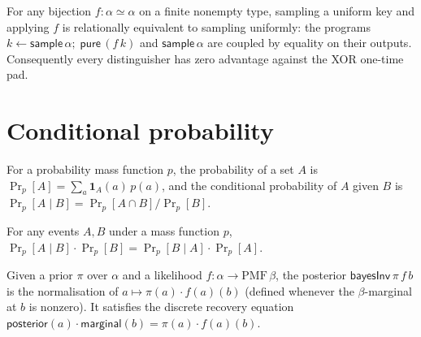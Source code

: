 \begin{lemma}
  \label{lem:rhoare-sample-bij}
  \leanok
  For any bijection $f : \alpha \simeq \alpha$ on a finite nonempty type,
  sampling a uniform key and applying $f$ is relationally equivalent to sampling
  uniformly: the programs $k \leftarrow \mathsf{sample}\,\alpha;\;
  \mathsf{pure}\,(f\,k)$ and $\mathsf{sample}\,\alpha$ are coupled by equality on
  their outputs. Consequently every distinguisher has zero advantage against the
  XOR one-time pad.
\end{lemma}

\section{Conditional probability}

\begin{definition}
  \label{def:pmf-condprob}
  \leanok
  For a probability mass function $p$, the probability of a set $A$ is
  $\Pr_p[A] = \sum_a \mathbf{1}_A(a)\,p(a)$, and the conditional probability of
  $A$ given $B$ is $\Pr_p[A \mid B] = \Pr_p[A \cap B] / \Pr_p[B]$.
\end{definition}

\begin{theorem}
  \label{thm:bayes}
  \leanok
  For any events $A, B$ under a mass function $p$,
  $\Pr_p[A \mid B]\cdot\Pr_p[B] = \Pr_p[B \mid A]\cdot\Pr_p[A]$.
\end{theorem}

\begin{definition}
  \label{def:bayes-inv}
  \leanok
  Given a prior $\pi$ over $\alpha$ and a likelihood $f : \alpha \to
  \mathrm{PMF}\,\beta$, the posterior $\mathsf{bayesInv}\,\pi\,f\,b$ is the
  normalisation of $a \mapsto \pi(a)\cdot f(a)(b)$ (defined whenever the
  $\beta$-marginal at $b$ is nonzero). It satisfies the discrete recovery
  equation $\mathsf{posterior}(a)\cdot\mathsf{marginal}(b) = \pi(a)\cdot f(a)(b)$.
\end{definition}
